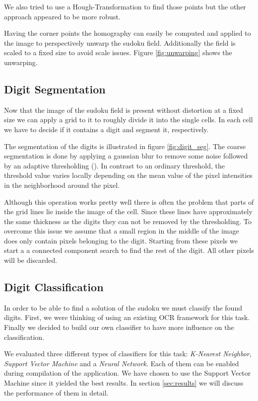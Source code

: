 \documentclass[
a4paper,     %
12pt         %
]{scrartcl}  %
\begin{document}
We also tried to use a Hough-Transformation to find those points but the
other approach appeared to be more robust.

Having the corner points the homography can easily be computed and applied
to the image to perspectively unwarp the sudoku field. Additionally the field
is scaled to a fixed size to avoid scale issues. Figure \ref{fig:unwarping}
shows the unwarping.

\subsection{Digit Segmentation}

Now that the image of the sudoku field is present without distortion at a
fixed size we can apply a grid to it to roughly divide it into the single
cells. In each cell we have to decide if it contains a digit and segment
it, respectively.

The segmentation of the digits is illustrated in figure \ref{fig:digit_seg}.
The coarse segmentation is done by applying a gaussian blur to remove some
noise followed by an adaptive thresholding (\cite{adaptive_thresh}). 
In contrast to an ordinary threshold, the threshold value varies locally
depending on the mean value of the pixel intensities in the 
neighborhood around the pixel.

Although this operation works pretty well there is often the problem that
parts of the grid lines lie inside the image of the cell. Since these lines
have approximately the same thickness as the digits they can not be removed
by the thresholding. To overcome this issue we assume that a small region
in the middle of the image does only contain pixels belonging to the digit.
Starting from these pixels we start a a connected component search to find the
rest of the digit. All other pixels will be discarded.

\subsection{Digit Classification}

In order to be able to find a solution of the sudoku we must classify the
found digits. First, we were thinking of using an existing OCR framework
for this task. Finally we decided to build our own classifier to have more influence
on the classification.

We evaluated three different types of classifiers for this task: \emph{K-Nearest Neighbor},
\emph{Support Vector Machine} and a \emph{Neural Network}. Each of them can be enabled
during compilation of the application. We have chosen to use the Support Vector Machine
since it yielded the best results. In section \ref{sec:results} we will discuss the performance
of them in detail.
\end{document}

